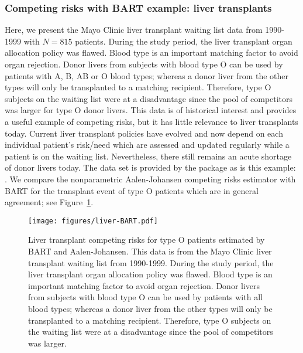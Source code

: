 \documentclass[article]{jss}
\begin{document}
\subsubsection{Competing risks with BART example: liver transplants}

Here, we present the Mayo Clinic liver transplant waiting list data
from 1990-1999 with $N=815$ patients.  During the study period, the
liver transplant organ allocation policy was flawed.  Blood type is an
important matching factor to avoid organ rejection.  Donor livers from
subjects with blood type O can be used by patients with A, B, AB or O
blood types; whereas a donor liver from the other types will only be
transplanted to a matching recipient.  Therefore, type O subjects on
the waiting list were at a disadvantage since the pool of competitors
was larger for type O donor livers.  This data is of historical
interest and provides a useful example of competing risks, but it has
little relevance to liver transplants today.  Current liver transplant
policies have evolved and now depend on each individual patient's
risk/need which are assessed and updated regularly while a patient is
on the waiting list.  Nevertheless, there still remains an acute shortage
of donor livers today.  The  data set is provided by
the   package as is this example:
.  We
compare the nonparametric Aalen-Johansen competing risks estimator
with BART for the transplant event of type O patients which are in
general agreement; see Figure~\ref{liver-transplant}.
\begin{figure}%
\begin{center}
\texttt{[image: figures/liver-BART.pdf]}
\end{center}
\caption{ \label{liver-transplant}Liver transplant competing risks for
  type O patients estimated by BART and Aalen-Johansen. This data is
  from the Mayo Clinic liver transplant waiting list from 1990-1999.
  During the study period, the liver transplant organ allocation
  policy was flawed.  Blood type is an important matching factor to
  avoid organ rejection.  Donor livers from subjects with blood type O
  can be used by patients with all blood types; whereas a
  donor liver from the other types will only be transplanted to a
  matching recipient.  Therefore, type O subjects on the waiting list
  were at a disadvantage since the pool of competitors was larger.  }
\end{figure}
\end{document}
